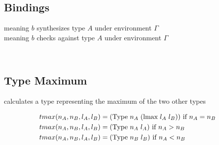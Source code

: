 \documentclass{article}
\begin{document}
\subsection{Bindings}

meaning $b$ synthesizes type $A$ under environment $\Gamma$
\\
meaning $b$ checks against type $A$ under environment $\Gamma$

\\
\subsection{Type Maximum}

 calculates a type representing the maximum of the two other types

\begin{align*}
tmax(n_A, n_B, l_A, l_B) &= (\text{Type} \hspace{0.3em} n_A \hspace{0.3em} (\text{lmax} \hspace{0.3em} l_A \hspace{0.3em} l_B)) \text{ if } n_A = n_B
\\
tmax(n_A, n_B, l_A, l_B) &= (\text{Type} \hspace{0.3em} n_A \hspace{0.3em} l_A) \text{ if } n_A > n_B
\\
tmax(n_A, n_B, l_A, l_B) &= (\text{Type} \hspace{0.3em} n_B \hspace{0.3em} l_B) \text{ if } n_A < n_B
\end{align*}
\end{document}
